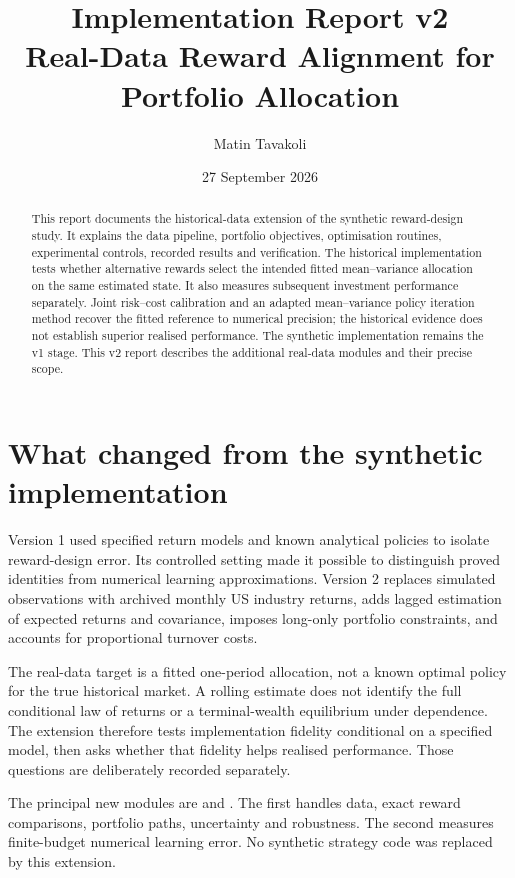 \documentclass[11pt,a4paper]{article}
\title{Implementation Report v2\\Real-Data Reward Alignment for Portfolio Allocation}
\author{Matin Tavakoli}
\date{27 September 2026}
\begin{document}
\maketitle
\begin{abstract}
This report documents the historical-data extension of the synthetic reward-design study. It explains the data pipeline, portfolio objectives, optimisation routines, experimental controls, recorded results and verification. The historical implementation tests whether alternative rewards select the intended fitted mean--variance allocation on the same estimated state. It also measures subsequent investment performance separately. Joint risk--cost calibration and an adapted mean--variance policy iteration method recover the fitted reference to numerical precision; the historical evidence does not establish superior realised performance. The synthetic implementation remains the v1 stage. This v2 report describes the additional real-data modules and their precise scope.
\end{abstract}
\setcounter{tocdepth}{1}
\begingroup\setlength{\parskip}{0pt}\tableofcontents\endgroup
\newpage
\section{What changed from the synthetic implementation}
Version 1 used specified return models and known analytical policies to isolate reward-design error. Its controlled setting made it possible to distinguish proved identities from numerical learning approximations. Version 2 replaces simulated observations with archived monthly US industry returns, adds lagged estimation of expected returns and covariance, imposes long-only portfolio constraints, and accounts for proportional turnover costs.

The real-data target is a fitted one-period allocation, not a known optimal policy for the true historical market. A rolling estimate does not identify the full conditional law of returns or a terminal-wealth equilibrium under dependence. The extension therefore tests implementation fidelity conditional on a specified model, then asks whether that fidelity helps realised performance. Those questions are deliberately recorded separately.

The principal new modules are  and . The first handles data, exact reward comparisons, portfolio paths, uncertainty and robustness. The second measures finite-budget numerical learning error. No synthetic strategy code was replaced by this extension.
\end{document}
